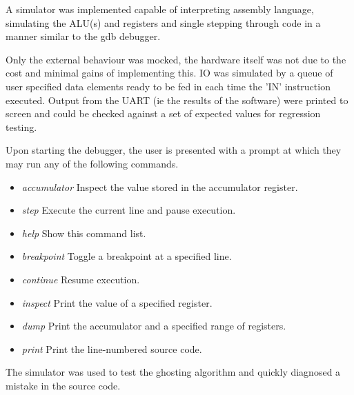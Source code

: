  A simulator was implemented capable of interpreting assembly language,
 simulating the ALU(s) and registers and single stepping through code in a
 manner similar to the gdb debugger.

 Only the external behaviour was mocked, the hardware itself was not due to the
 cost and minimal gains of implementing this. IO was simulated by a queue of
 user specified data elements ready to be fed in each time the 'IN' instruction
 executed. Output from the UART (ie the results of the software) were printed to
 screen and could be checked against a set of expected values for regression
 testing.

 Upon starting the debugger, the user is presented with a prompt at which they
 may run any of the following commands.
 \begin{itemize}
    \item \emph{accumulator} Inspect the value stored in the accumulator register.
    \item \emph{step} Execute the current line and pause execution.
    \item \emph{help} Show this command list.
    \item \emph{breakpoint} Toggle a breakpoint at a specified line.
    \item \emph{continue} Resume execution.
    \item \emph{inspect} Print the value of a specified register.
    \item \emph{dump} Print the accumulator and a specified range of registers.
    \item \emph{print} Print the line-numbered source code.
 \end{itemize}

 The simulator was used to test the ghosting algorithm and quickly diagnosed a
 mistake in the source code.
